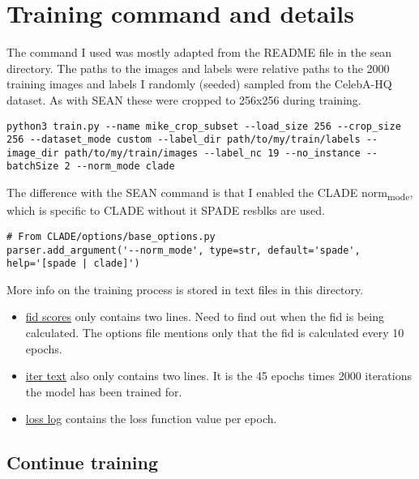 \documentclass{memoir}
\author{Mike Vink}
\date{\today}
\title{}
\begin{document}
\tableofcontents


\chapter{Training command and details}
\label{sec:org11f4e95}

The command I used was mostly adapted from the README file in the sean
directory. The paths to the images and labels were relative paths to the 2000
training images and labels I randomly (seeded) sampled from the CelebA-HQ
dataset. As with SEAN these were cropped to 256x256 during training.

\begin{verbatim}
python3 train.py --name mike_crop_subset --load_size 256 --crop_size 256 --dataset_mode custom --label_dir path/to/my/train/labels --image_dir path/to/my/train/images --label_nc 19 --no_instance --batchSize 2 --norm_mode clade
\end{verbatim}

The difference with the SEAN command is that I enabled the CLADE norm\textsubscript{mode}, which is specific to CLADE without it SPADE resblks are used.

\begin{verbatim}
# From CLADE/options/base_options.py
parser.add_argument('--norm_mode', type=str, default='spade', help='[spade | clade]')
\end{verbatim}

More info on the training process is stored in text files in this directory.

\begin{itemize}
\item \href{fid.txt}{fid scores} only contains two lines. Need to find out when the fid is being
calculated. The options file mentions only that the fid is calculated every 10 epochs.
\item \href{iter.txt}{iter text} also only contains two lines. It is the 45 epochs times 2000
iterations the model has been trained for.
\item \href{loss\_log.txt}{loss log} contains the loss function value per epoch.
\end{itemize}

\section{Continue training}
\label{sec:org8bd4128}
\end{document}
